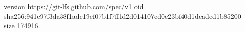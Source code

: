 version https://git-lfs.github.com/spec/v1
oid sha256:941e97f3da38f1adc19ef07b1f7ff1d2d014107cd0e23bf40d1dcaded1b85200
size 174916
